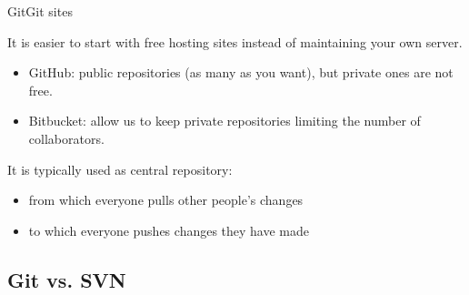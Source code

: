 \documentclass[10pt,compress]{beamer} %
\begin{document}
\begin{frame}{Git}{Git sites}


It is easier to start with free hosting sites instead of maintaining your own server.

\begin{itemize}
 \item \alert{GitHub}: public repositories (as many as you want), but private ones are not free.
 \item \alert{Bitbucket}: allow us to keep private repositories limiting the number of collaborators.
\end{itemize}

It is typically used as central repository:
\begin{itemize}
 \item from which everyone pulls other people’s changes
 \item to which everyone pushes changes they have made
\end{itemize}

\end{frame}

\subsection{Git vs. SVN}
\end{document}
